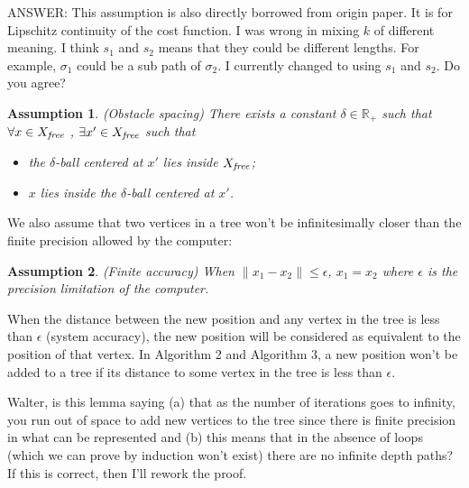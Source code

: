 \documentclass{article}
\newtheorem{asmp}{Assumption}
\begin{document}


{\sc ANSWER: This assumption is also directly borrowed from origin paper. It is for Lipschitz continuity of the cost function.
I was wrong in mixing $ k $ of different meaning. I think $s_1$ and $s_2$ means that they could be different lengths. For example, $ \sigma_{1} $ could be a sub path of $ \sigma_{2} $. 
I currently changed to using $s_1$ and $s_2$. Do you agree?}

\begin{asmp}{(Obstacle spacing)}
\label{asmp:spacing}
There exists a constant $ \delta \in \mathbb{R}_{+} $ such that $ \forall x \in X_{\it free} $ , $ \exists x' \in X_{\it free} $ such that
\begin{itemize}
\item the $ \delta $-ball centered at $ x' $ lies inside $ X_{\it free} $;
\item $ x $ lies inside the $ \delta $-ball centered at $ x' $.
\end{itemize}
\end{asmp}

We also assume that two vertices in a tree won't be infinitesimally closer than the finite precision allowed by the computer:
\begin{asmp}{(Finite accuracy)}
\label{asmp:finite_accuracy}
When $ \lVert x_{1} - x_{2} \rVert \leq \epsilon $, $ x_{1} = x_{2} $ where $\epsilon$ is the precision limitation of the computer.
\end{asmp}
When the distance between the new position and any vertex in the tree is less than $ \epsilon $ (system accuracy), the new position will be considered as equivalent to the position of that vertex.
In Algorithm 2 and Algorithm 3, a new position won't be added to a tree if its distance to some vertex in the tree is less than $ \epsilon $.

{\sc Walter, is this lemma saying 
(a) that as the number of iterations goes to infinity, you run out of space to add new vertices to the tree since there is finite precision in what can be represented and 
(b) this means that in the absence of loops (which we can prove by induction won't exist) there are no infinite depth paths?  If this is correct, then I'll rework the proof.}
\end{document}
